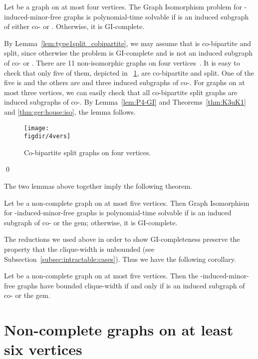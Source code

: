 \documentclass[envcountsame,envcountsect,11pt,a4paper]{llncs}
\renewenvironment{proof}{\begin{Proof}}{\qed\end{Proof}}
\newcommand{\figref}[1]{\figurename~\ref{#1}}
\newcommand{\figdir}{.}
\begin{document}
\begin{lemma}
Let  be a graph on at most four vertices.
The {\sc Graph Isomorphism} problem for -induced-minor-free graphs is polynomial-time solvable
if  is an induced subgraph of either co- 
or . Otherwise, it is GI-complete.
\end{lemma}
\begin{proof}
By Lemma~\ref{lem:type1split_cobipartite}, we may assume that  is co-bipartite and split,
since otherwise the problem is GI-complete and
 is not an induced subgraph of co- or .
There are 11 non-isomorphic graphs on four vertices~\cite{ISGCI-small_graphs}.
It is easy to check that only five of them, depicted in \figref{fig:4vers}, are co-bipartite and split.
One of the five is  and the others are  and three induced subgraphs of co-.
For graphs on at most three vertices,
we can easily check that all co-bipartite split graphs are
induced subgraphs of co-.
By Lemma~\ref{lem:P4-GI} and Theorems~\ref{thm:K3uK1} and \ref{thm:ger:house:iso},
the lemma follows.
\begin{figure}[htb]
  \centering
  \texttt{[image: \\figdir/4vers]}
  \caption{Co-bipartite split graphs on four vertices.}
  \label{fig:4vers}
\end{figure}
\end{proof}


The two lemmas above together imply the following theorem.
\begin{theorem}
Let  be a non-complete graph on at most five vertices.
Then {\sc Graph Isomorphism} for -induced-minor-free graphs
is polynomial-time solvable if  is an induced subgraph of
co- or the gem;
otherwise, it is GI-complete.
\end{theorem}

The reductions we used above in order to show GI-completeness preserve
the property that the clique-width is unbounded (see Subsection~\ref{subsec:intractable:cases}). Thus we have the following corollary.
\begin{corollary}
Let  be a non-complete graph on at most five vertices.
Then the -induced-minor-free graphs have bounded clique-width
if and only if  is an induced subgraph of co- or the gem.
\end{corollary}




\section{Non-complete graphs on at least six vertices}\label{sec:at:least:6:vert}
\end{document}
